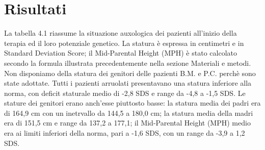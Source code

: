 \chapter{Risultati}

La tabella 4.1 riassume la situazione auxologica dei pazienti all'inizio della terapia ed il loro potenziale genetico. La statura è espressa in centimetri e in Standard Deviation Score; il Mid-Parental Height (MPH) è stato calcolato secondo la formula illustrata precedentemente nella sezione Materiali e metodi. Non disponiamo della statura dei genitori delle pazienti B.M. e P.C. perchè sono state adottate. Tutti i pazienti arruolati presentavano una statura inferiore alla norma, con deficit staturale medio di -2,8 SDS e range da -4,8 a -1,5 SDS. Le stature dei genitori erano anch'esse piuttosto basse: la statura media dei padri era di 164,9 cm con un inetrvallo da 144,5 a 180,0 cm; la statura media della madri era di 151,5 cm e range da 137,2 a 177,1; il Mid-Parental Height (MPH) medio era ai limiti inferiori della norma, pari a -1,6 SDS, con un range da -3,9 a 1,2 SDS.

